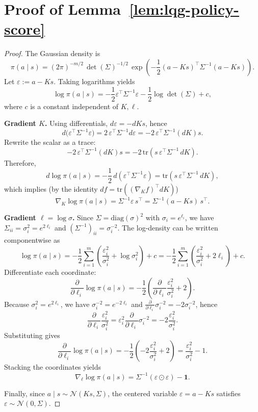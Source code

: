 \section{Proof of Lemma~\ref{lem:lqg-policy-score} }
\label{sec:app-proof-lqg-policy-score}

\begin{proof}
The Gaussian density is
\[
\pi(a\mid s)
= (2\pi)^{-m/2}\,\det(\Sigma)^{-1/2}\,
\exp\!\left(-\frac12 (a-Ks)^\top \Sigma^{-1}(a-Ks)\right).
\]
Let $\varepsilon := a-Ks$. Taking logarithms yields
\[
\log \pi(a\mid s)
= -\frac12 \varepsilon^\top \Sigma^{-1}\varepsilon
-\frac12 \log\det(\Sigma) + c,
\]
where $c$ is a constant independent of $K,\ell$.

\textbf{Gradient \wrt $K$.}
Using differentials, $d\varepsilon = -dK s$, hence
\[
d\big(\varepsilon^\top \Sigma^{-1}\varepsilon\big)
= 2\,\varepsilon^\top \Sigma^{-1} d\varepsilon
= -2\,\varepsilon^\top \Sigma^{-1} (dK)s.
\]
Rewrite the scalar as a trace:
\[
-2\,\varepsilon^\top \Sigma^{-1} (dK)s
= -2\,\mathrm{tr}\!\left( s\,\varepsilon^\top \Sigma^{-1} \, dK \right).
\]
Therefore,
\[
d\log \pi(a\mid s)
= -\frac12\, d(\varepsilon^\top \Sigma^{-1}\varepsilon)
= \mathrm{tr}\!\left( s\,\varepsilon^\top \Sigma^{-1}\, dK \right),
\]
which implies (by the identity $d f = \mathrm{tr}((\nabla_K f)^\top dK)$)
\[
\nabla_K \log \pi(a\mid s)
= \Sigma^{-1}\varepsilon\, s^\top
= \Sigma^{-1}(a-Ks)\,s^\top.
\]

\textbf{Gradient \wrt $\ell=\log\sigma$.}
Since $\Sigma=\mathrm{diag}(\sigma)^2$ with $\sigma_i = e^{\ell_i}$, we have
$\Sigma_{ii} = \sigma_i^2 = e^{2\ell_i}$ and $(\Sigma^{-1})_{ii} = \sigma_i^{-2}$.
The log-density can be written componentwise as
\[
\log \pi(a\mid s)
= -\frac12\sum_{i=1}^m\left(\frac{\varepsilon_i^2}{\sigma_i^2} + \log \sigma_i^2\right) + c
= -\frac12\sum_{i=1}^m\left(\frac{\varepsilon_i^2}{\sigma_i^2} + 2\ell_i\right) + c.
\]
Differentiate each coordinate:
\[
\frac{\partial}{\partial \ell_i}\log \pi(a\mid s)
= -\frac12\left(\frac{\partial}{\partial \ell_i}\frac{\varepsilon_i^2}{\sigma_i^2} + 2\right).
\]
Because $\sigma_i^2=e^{2\ell_i}$, we have $\sigma_i^{-2}=e^{-2\ell_i}$ and
$\frac{\partial}{\partial \ell_i}\sigma_i^{-2} = -2\sigma_i^{-2}$, hence
\[
\frac{\partial}{\partial \ell_i}\frac{\varepsilon_i^2}{\sigma_i^2}
= \varepsilon_i^2 \frac{\partial}{\partial \ell_i}\sigma_i^{-2}
= -2\frac{\varepsilon_i^2}{\sigma_i^2}.
\]
Substituting gives
\[
\frac{\partial}{\partial \ell_i}\log \pi(a\mid s)
= -\frac12\left(-2\frac{\varepsilon_i^2}{\sigma_i^2} + 2\right)
= \frac{\varepsilon_i^2}{\sigma_i^2} - 1.
\]
Stacking the coordinates yields
\[
\nabla_\ell \log \pi(a\mid s)
= \Sigma^{-1}(\varepsilon\odot \varepsilon) - \mathbf{1}.
\]

Finally, since $a\mid s \sim \mathcal{N}(Ks,\Sigma)$, the centered variable
$\varepsilon = a-Ks$ satisfies $\varepsilon \sim \mathcal{N}(0,\Sigma)$.
\end{proof}


